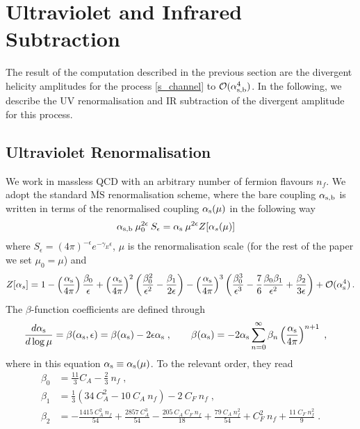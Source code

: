 
\section{Ultraviolet and Infrared Subtraction}
\label{subtraction}

The result of the computation described in the previous section are the divergent helicity amplitudes for the process \eqref{s_channel} to $\mathcal{O}(\alpha_\mathrm{s,b}^4)$.  
In the following, we describe the UV renormalisation and IR subtraction of the divergent amplitude for this process. 

\subsection{Ultraviolet Renormalisation}
We work in massless QCD with an arbitrary number of fermion flavours $n_f$.  We adopt the standard $\overline{\mathrm{MS}}$ renormalisation scheme,  where the bare coupling $\alpha_\mathrm{s,b}$ is written in terms of the renormalised coupling $\alpha_\mathrm{s}(\mu)$ in the following way
\begin{align}
\label{bare_to_phys}
\alpha_\mathrm{s,b} \: \mu_0^{2\epsilon} \: S_\epsilon &= \alpha_\mathrm{s} \: \mu^{2\epsilon} Z[\alpha_s(\mu)] 
\end{align}
where $S_\epsilon = (4 \pi)^{-\epsilon} e^{-\gamma_E \epsilon}$, $\mu$ is the renormalisation scale (for the rest of the paper we set $\mu_0=\mu$) and
\begin{align}
Z[\alpha_s]  =  1 -  \left( \frac{\alpha_\mathrm{s}}{4 \pi} \right) \frac{ \beta_0 }{\epsilon } + \left(\frac{\alpha_\mathrm{s}}{4 \pi}\right)^2 \left( \frac{\beta_0^2}{\epsilon^2} - \frac{\beta_1 }{2 \epsilon} \right)- 
\left(\frac{\alpha_\mathrm{s}}{4 \pi}\right)^3  \left( \frac{\beta_0^3}{\epsilon^3} - \frac{ 7}{6} \frac{\beta_0 \beta_1}{\epsilon^2}+ \frac{\beta_2}{3 \epsilon} \right)  + \mathcal{O}(\alpha_\mathrm{s}^4)\,.
\end{align}
The $\beta$-function coefficients are defined through
\begin{align}
\frac{d \alpha_\mathrm{s} }{d \log \mu} &= \beta(\alpha_\mathrm{s},\epsilon) = \beta(\alpha_\mathrm{s}) - 2\epsilon \alpha_\mathrm{s} \; , \qquad
\beta(\alpha_\mathrm{s}) = -2 \alpha_\mathrm{s} \sum_ {n=0}^\infty \beta_n \left(\frac{\alpha_\mathrm{s}}{4 \pi}\right)^{n+1} \; ,
\end{align}
where in this equation $\alpha_\mathrm{s}\equiv\alpha_\mathrm{s}(\mu)$. To the relevant order, they read
\begin{align}
\beta_0 &= \frac{11}{3} C_A - \frac{2}{3}\: n_f \; , \nonumber\\%
\beta_1 &= \frac{1}{3} \left(34 \: C_A^2-10\: C_A \:n_f \right)-2 \:C_F\: n_f \; ,\\ %
\beta_2 &= -\frac{1415 \:C_A^2 \:n_f}{54}+\frac{2857\: C_A^3}{54}-\frac{205\: C_A\: C_F\:
   n_f}{18}+\frac{79 \:C_A \:n_f^2}{54}+C_F^2 \:n_f+\frac{11\: C_F \:n_f^2}{9} \; .\nonumber
\end{align}
